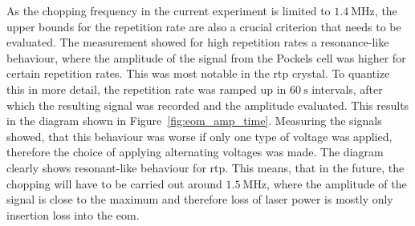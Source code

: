 \begin{figure}[tbp]%
\end{figure}

As the chopping frequency in the current experiment is limited to $\SI{1.4}{\mega\hertz}$, the upper bounds for the repetition rate are also a crucial criterion that needs to be evaluated. The measurement showed for high repetition rates a resonance-like behaviour, where the amplitude of the signal from the Pockels cell was higher for certain repetition rates. This was most notable in the \ac{rtp} crystal. To quantize this in more detail, the repetition rate was ramped up in $\SI{60}{\second}$ intervals, after which the resulting signal was recorded and the amplitude evaluated. This results in the diagram shown in Figure~\ref{fig:eom_amp_time}. Measuring the signals showed, that this behaviour was worse if only one type of voltage was applied, therefore the choice of applying alternating voltages was made. The diagram clearly shows resonant-like behaviour for \ac{rtp}. This means, that in the future, the chopping will have to be carried out around $\SI{1.5}{\mega\hertz}$, where the amplitude of the signal is close to the maximum and therefore loss of laser power is mostly only insertion loss into the \ac{eom}.

\begin{figure}[tbp]%
\end{figure}

